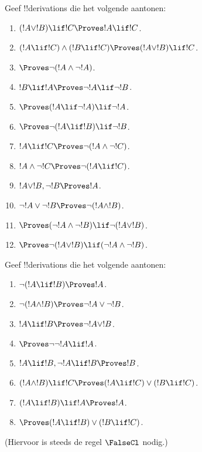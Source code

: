 \documentclass[openany]{memoir}
\begin{document}
\begin{prob}
Geef !!{derivation}s die het volgende aantonen:
\begin{enumerate}
\item $(!A \lor !B) \lif !C \Proves !A \lif !C$.
\item $(!A \lif !C) \land (!B \lif !C) \Proves (!A \lor !B) \lif !C$.
\item $\Proves \lnot(!A \land \lnot !A)$.
\item $!B \lif !A \Proves \lnot !A \lif \lnot !B$.
\item $\Proves (!A \lif \lnot !A) \lif \lnot !A$.
\item $\Proves \lnot(!A \lif !B) \lif \lnot !B$.
\item $!A \lif !C \Proves \lnot (!A \land \lnot !C)$.
\item $!A \land \lnot !C \Proves \lnot (!A \lif !C)$.
\item $!A \lor !B, \lnot !B \Proves !A$.
\item $\lnot !A \lor \lnot !B \Proves \lnot(!A \land !B)$.
\item $\Proves (\lnot !A \land \lnot !B) \lif\lnot(!A \lor !B)$.
\item $\Proves \lnot(!A \lor !B) \lif (\lnot !A \land \lnot !B)$.
\end{enumerate}
\end{prob}

\begin{prob}
Geef !!{derivation}s die het volgende aantonen:
\begin{enumerate}
\item $\lnot(!A \lif !B) \Proves !A$.
\item $\lnot(!A \land !B) \Proves \lnot !A \lor \lnot !B$.
\item $!A \lif !B \Proves \lnot !A \lor !B$.
\item $\Proves \lnot \lnot !A \lif !A$.
\item $!A \lif !B, \lnot !A \lif !B \Proves !B$.
\item $(!A \land !B) \lif !C \Proves (!A \lif !C) \lor (!B \lif !C)$.
\item $(!A \lif !B) \lif !A \Proves !A$.
\item $\Proves (!A \lif !B) \lor (!B \lif !C)$.
\end{enumerate}
(Hiervoor is steeds de regel $\FalseCl$ nodig.)
\end{prob}
\endgroup

\begingroup
\def\olfilename{OLP-0090}
\def\olfilepath{content/first-order-logic/natural-deduction/}
\hypertarget{unit-OLP-0090}{}
\end{document}
